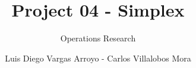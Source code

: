 \documentclass[12]{beamer}
\title{Project 04 - Simplex}
\subtitle{Operations Research}
\author{Luis Diego Vargas Arroyo - Carlos Villalobos Mora}
\begin{document}
\frame{\titlepage}
\end{document}
